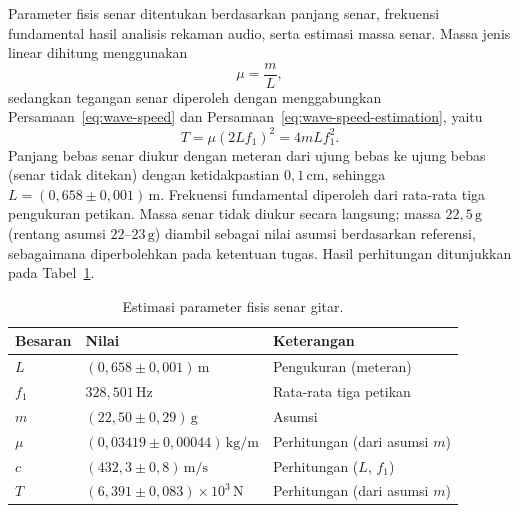 \documentclass[aps,prl,twocolumn,superscriptaddress]{revtex4-2}
\begin{document}
    Parameter fisis senar ditentukan berdasarkan panjang senar, frekuensi fundamental hasil analisis rekaman audio, serta estimasi massa senar. 
    Massa jenis linear dihitung menggunakan
    \begin{equation}
        \mu = \frac{m}{L},
        \label{eq:linear-density}
    \end{equation}
    sedangkan tegangan senar diperoleh dengan menggabungkan Persamaan~\eqref{eq:wave-speed} dan Persamaan~\eqref{eq:wave-speed-estimation}, yaitu
    \begin{equation}
        T = \mu(2Lf_1)^2 = 4mLf_1^2.
        \label{eq:string-tension}
    \end{equation}
    Panjang bebas senar diukur dengan meteran dari ujung bebas ke ujung bebas (senar tidak ditekan) dengan ketidakpastian $0{,}1\,\mathrm{cm}$, sehingga $L=(0{,}658\pm0{,}001)\,\mathrm{m}$. 
    Frekuensi fundamental diperoleh dari rata-rata tiga pengukuran petikan. 
    Massa senar tidak diukur secara langsung; massa $22{,}5\,\mathrm{g}$ (rentang asumsi $22$--$23\,\mathrm{g}$) diambil sebagai nilai asumsi berdasarkan referensi, sebagaimana diperbolehkan pada ketentuan tugas.
    Hasil perhitungan ditunjukkan pada Tabel~\ref{tab:physical-parameters}.

    \begin{table}[htbp]
        \centering
        \caption{Estimasi parameter fisis senar gitar.}
        \label{tab:physical-parameters}
        \begin{tabular}{lll}
            \hline
            Besaran & Nilai & Keterangan \\
            \hline
            $L$ &
            $(0{,}658\pm0{,}001)\,\mathrm{m}$ &
            Pengukuran (meteran) \\

            $f_1$ &
            $328{,}501\,\mathrm{Hz}$ &
            Rata-rata tiga petikan \\

            $m$ &
            $(22{,}50\pm0{,}29)\,\mathrm{g}$ &
            Asumsi \\

            $\mu$ &
            $(0{,}03419\pm0{,}00044)\,\mathrm{kg/m}$ &
            Perhitungan (dari asumsi $m$) \\

            $c$ &
            $(432{,}3\pm0{,}8)\,\mathrm{m/s}$ &
            Perhitungan ($L$, $f_1$) \\

            $T$ &
            $(6{,}391\pm0{,}083)\times10^3\,\mathrm{N}$ &
            Perhitungan (dari asumsi $m$) \\
            \hline
        \end{tabular}
    \end{table}
\end{document}
